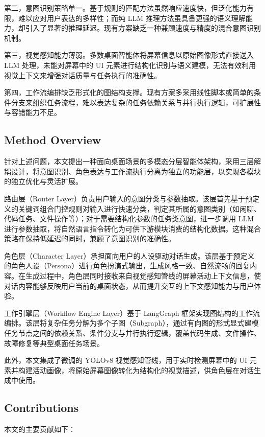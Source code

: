 第二，意图识别策略单一。基于规则的匹配方法虽然响应速度快，但泛化能力有限，难以应对用户表达的多样性；而纯 LLM 推理方法虽具备更强的语义理解能力，却引入了显著的推理延迟。现有方案缺乏一种兼顾速度与精度的混合意图识别机制。

第三，视觉感知能力薄弱。多数桌面智能体将屏幕信息以原始图像形式直接送入 LLM 处理，未能对屏幕中的 UI 元素进行结构化识别与语义建模，无法有效利用视觉上下文来增强对话质量与任务执行的准确性。

第四，工作流编排缺乏形式化的图结构支撑。现有方案多采用线性脚本或简单的条件分支来组织任务流程，难以表达复杂的任务依赖关系与并行执行逻辑，可扩展性与容错能力不足。

\subsection{Method Overview}

针对上述问题，本文提出一种面向桌面场景的多模态分层智能体架构，采用三层解耦设计，将意图识别、角色表达与工作流执行分离为独立的功能层，以实现各模块的独立优化与灵活扩展。

路由层（Router Layer）负责用户输入的意图分类与参数抽取。该层首先基于预定义的关键词组合门控规则对输入进行快速分类，判定其所属的意图类别（如闲聊、代码任务、文件操作等）；对于需要结构化参数的任务类意图，进一步调用 LLM 进行参数抽取，将自然语言指令转化为可供下游模块消费的结构化数据。这种混合策略在保持低延迟的同时，兼顾了意图识别的准确性。

角色层（Character Layer）承担面向用户的人设驱动对话生成。该层基于预定义的角色人设（Persona）进行角色扮演式输出，生成风格一致、自然流畅的回复内容。在生成过程中，角色层同时接收来自视觉感知管线的屏幕活动上下文信息，使对话内容能够反映用户当前的桌面状态，从而提升交互的上下文感知能力与用户体验。

工作引擎层（Workflow Engine Layer）基于 LangGraph\cite{langchain2024langgraph} 框架实现图结构的工作流编排。该层将复杂任务分解为多个子图（Subgraph），通过有向图的形式显式建模任务节点之间的依赖关系、条件分支与并行执行逻辑，覆盖代码生成、文件操作、故障修复等典型桌面任务场景。

此外，本文集成了微调的 YOLOv8\cite{jocher2023yolov8} 视觉感知管线，用于实时检测屏幕中的 UI 元素并构建活动画像，将原始屏幕图像转化为结构化的视觉描述，供角色层在对话生成中使用。

\subsection{Contributions}

本文的主要贡献如下：

